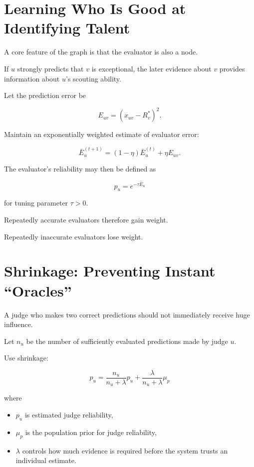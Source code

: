 \documentclass[11pt]{article}
\begin{document}
\section{Learning Who Is Good at Identifying Talent}

A core feature of the graph is that the evaluator is also a node.

If \(u\) strongly predicts that \(v\) is exceptional, the later evidence about
\(v\) provides information about \(u\)'s scouting ability.

Let the prediction error be

\[
E_{uv}
=
(x_{uv}-R_v^\ast)^2.
\]

Maintain an exponentially weighted estimate of evaluator error:

\[
\bar{E}_u^{(t+1)}
=
(1-\eta)\bar{E}_u^{(t)}
+
\eta E_{uv}.
\]

The evaluator's reliability may then be defined as

\[
\boxed{
p_u
=
e^{-\tau \bar{E}_u}
}
\]

for tuning parameter \(\tau > 0\).

Repeatedly accurate evaluators therefore gain weight.

Repeatedly inaccurate evaluators lose weight.

\section{Shrinkage: Preventing Instant ``Oracles''}

A judge who makes two correct predictions should not immediately receive huge
influence.

Let \(n_u\) be the number of sufficiently evaluated predictions made by judge
\(u\).

Use shrinkage:

\[
\boxed{
\hat p_u
=
\frac{n_u}{n_u+\lambda}p_u
+
\frac{\lambda}{n_u+\lambda}\mu_p
}
\]

where

\begin{itemize}
    \item \(p_u\) is estimated judge reliability,
    \item \(\mu_p\) is the population prior for judge reliability,
    \item \(\lambda\) controls how much evidence is required before the system trusts an individual estimate.
\end{itemize}
\end{document}
